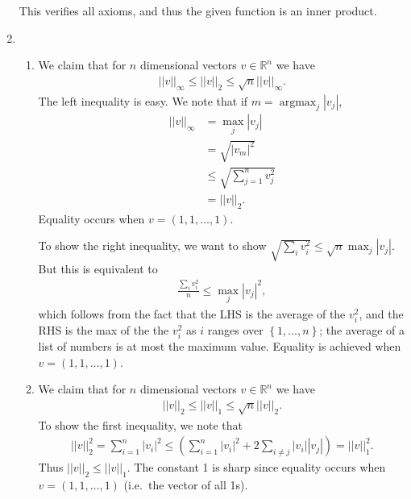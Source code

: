 \documentclass{article}
\newcommand{\RR}{\mathbb{R}}
\DeclareMathOperator{\argmax}{argmax}
\begin{document}
\begin{enumerate}
    This verifies all axioms, and thus the given function is an inner product.
  \item 
    \begin{enumerate}
      \item We claim that for $n$ dimensional vectors $v \in \RR^n$ we have
        \begin{align*}
          ||v||_{\infty} \leq ||v||_2 \leq  \sqrt{n} ||v||_{\infty}.
        \end{align*}
        The left inequality is easy.  We note that if $m = \argmax_{j} |v_j|$,
        \begin{align*}
          ||v||_{\infty} &= \max_{j} |v_j| \\
          &= \sqrt{|v_m|^2} \\
          &\leq \sqrt{\sum_{j=1}^{n} v_j^2} \\
          &= ||v||_2.
        \end{align*}
        Equality occurs when $v = (1, 1, \dots, 1)$.

        To show the right inequality, we want to show $\sqrt{\sum_{i} v_i^2} \leq \sqrt{n} \max_j |v_j|$.  But this is equivalent to
        \begin{align*}
          \frac{\sum_i v_i^2}{ n} \leq \max_j |v_j|^2,
        \end{align*}
        which follows from the fact that the LHS is the average of the $v_i^2$, and the RHS is the max of the the $v_i^2$ as $i$ ranges over $\left\{ 1, \dots, n \right\}$; the average of a list of numbers is at most the maximum value.  Equality is achieved when $v = (1, 1, \dots, 1)$.

      \item We claim that for $n$ dimensional vectors $v \in \RR^n$ we have
        \begin{align*}
          ||v||_2 \leq ||v||_1 \leq \sqrt{n} ||v||_2.
        \end{align*}
        To show the first inequality, we note that
        \begin{align*}
          ||v||_2^2 = \sum_{i=1}^{n} |v_i|^2 \leq \left( \sum_{i=1}^{n} |v_i|^2 + 2 \sum_{i \neq j} |v_i| |v_j|  \right) = ||v||_1^2.
        \end{align*}
        Thus $||v||_2 \leq ||v||_1$.  The constant 1 is sharp since equality occurs when $v = (1, 1, \dots, 1)$ (i.e.\ the vector of all 1s).


\end{enumerate}
\end{enumerate}
\end{document}
